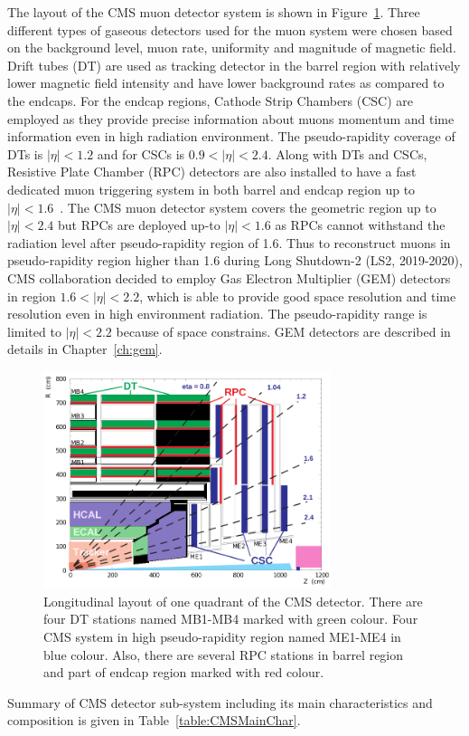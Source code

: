 {{{\begin{figure}[!htbp]
\end{figure}
The layout of the CMS muon detector system is shown in Figure~\ref{fig:muon-system-layout}. Three different types of gaseous detectors used for the muon system  were chosen based on the background level, muon rate, uniformity and magnitude of magnetic field. Drift tubes (DT) are used as tracking detector in the barrel region with relatively lower magnetic field intensity and have lower background rates as compared to the endcaps. 
For the endcap regions, Cathode Strip Chambers (CSC) are employed as they provide precise information about muons momentum and time information even in high radiation environment. The pseudo-rapidity coverage of DTs is $|\eta|<1.2$ and for CSCs is $0.9<|\eta|<2.4$. Along with DTs and CSCs, Resistive Plate Chamber (RPC) detectors are also installed to have a fast dedicated  muon triggering system in both barrel and endcap region up to $|\eta|<1.6$~\cite{muon-tdr}. The CMS muon detector system covers the geometric region up to $|\eta|<2.4$ but RPCs are deployed up-to $|\eta|<1.6$ as RPCs cannot withstand the radiation level after pseudo-rapidity region of 1.6. Thus to reconstruct muons in pseudo-rapidity region higher than 1.6 during Long Shutdown-2 (LS2, 2019-2020), CMS collaboration decided to employ Gas Electron Multiplier (GEM) detectors in region  $1.6<|\eta|<2.2$, which is able to provide good space resolution and time resolution even in high environment radiation. The pseudo-rapidity range is limited to $|\eta|<2.2$ because of space constrains. GEM  detectors are described in details in Chapter~\ref{ch:gem}.
\begin{figure}[!htbp]
	\centering
	\includegraphics[width=0.75\textwidth]{figures/LHC/pictures_MuonSys-mod3.png}
	\caption{Longitudinal layout of one quadrant of the CMS detector. There are four DT stations named MB1-MB4 marked with green colour. Four CMS system in high pseudo-rapidity region named ME1-ME4 in blue colour. Also, there are several RPC stations in barrel region and part of endcap region marked with red colour.}
	\label{fig:muon-system-layout}
\end{figure}
Summary of CMS detector sub-system including its main characteristics and composition is given in Table~\ref{table:CMSMainChar}.

}}}
